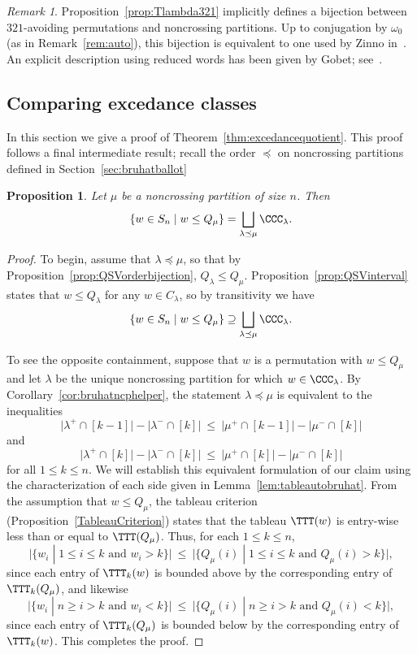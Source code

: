 \documentclass[12pt]{amsart}
\newtheorem{prop}[equation]{Proposition}
\theoremstyle{definition}
\theoremstyle{remark}
\newtheorem{rem}[equation]{Remark}
\numberwithin{equation}{section}
\begin{document}
\begin{rem}
Proposition~\ref{prop:Tlambda321} implicitly defines a bijection between $321$-avoiding permutations and noncrossing partitions.  Up to conjugation by $\omega_{0}$ (as in Remark~\ref{rem:auto}), this bijection is equivalent to one used by Zinno in~\cite{Zinno}.  An explicit description using reduced words has been given by Gobet; see~\cite{Gobet}.
\end{rem}


\subsection{Comparing excedance classes}
\label{sec:ex3}

In this section we give a proof of Theorem~\ref{thm:excedancequotient}.  This proof follows a final intermediate result; recall the order $\preceq$ on noncrossing partitions defined in Section~\ref{sec:bruhatballot}

\begin{prop}
\label{prop:Qdominates}
Let $\mu$ be a noncrossing partition of size $n$.  Then
\[
\{w \in S_{n} \;|\; w \le Q_{\mu}\} = \bigsqcup_{\lambda \preceq \mu} \CCC_{\lambda}.
\]
\end{prop}
\begin{proof}
To begin, assume that $\lambda \preceq \mu$, so that by Proposition~\ref{prop:QSVorderbijection}, $Q_{\lambda} \le Q_{\mu}$.  Proposition~\ref{prop:QSVinterval} states that $w \le Q_{\lambda}$ for any $w \in C_{\lambda}$, so by transitivity we have
\[
\{w \in S_{n} \;|\; w \le Q_{\mu}\} \supseteq \bigsqcup_{\lambda \preceq \mu} \CCC_{\lambda}.
\]

To see the opposite containment, suppose that $w$ is a permutation with $w \le Q_{\mu}$ and let $\lambda$ be the unique noncrossing partition for which $w \in \CCC_{\lambda}$.  
By Corollary~\ref{cor:bruhatncphelper}, the statement $\lambda \preceq \mu$ is equivalent to the inequalities
\[
\big|\lambda^{+} \cap [k-1]\big| - \big|\lambda^{-} \cap [k]\big| \  \le\   \big|\mu^{+} \cap [k-1]\big| - |\mu^{-} \cap [k]\big|
\]
and
\[
\big|\lambda^{+} \cap [k]\big| - \big|\lambda^{-} \cap [k]\big|\  \le \  \big|\mu^{+} \cap [k]\big| - \big|\mu^{-} \cap [k]\big|
\]
for all $1 \le k \le n$.  
We will establish this equivalent formulation of our claim using the characterization of each side given in Lemma~\ref{lem:tableautobruhat}.  
From the assumption that $w \le Q_{\mu}$, the tableau criterion (Proposition~\ref{TableauCriterion}) states that the tableau $\TTT(w)$ is entry-wise less than or equal to $\TTT(Q_{\mu})$.  
Thus, for each $1 \le k \le n$, 
\[
\big|\{w_{i} \;|\; \text{$1 \le i \le k$ and $w_{i} > k$} \}\big|
\ \le\ 
\big|\{Q_{\mu}(i) \;|\; \text{$1 \le i \le k$ and $Q_{\mu}(i) > k$} \}\big|,
\]
since each entry of $\TTT_{k}(w)$ is bounded above by the corresponding entry of $\TTT_{k}(Q_{\mu})$, and likewise
\[
\big|\{ w_{i} \;|\; \text{$n \ge i > k$ and $w_{i} < k$} \}\big| 
\ \le\ 
\big|\{ Q_{\mu}(i) \;|\; \text{$n \ge i > k$ and $Q_{\mu}(i) < k$} \}\big|,
\]
since each entry of $\TTT_{k}(Q_{\mu})$ is bounded below by the corresponding entry of $\TTT_{k}(w)$.  This completes the proof.
\end{proof}
\end{document}
